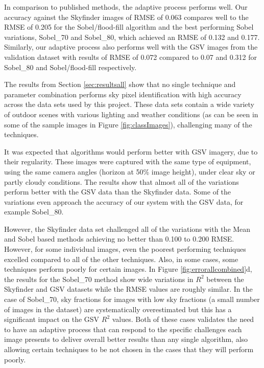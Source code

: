 \documentclass[final,3p,times,authoryear]{elsarticle}
\begin{document}
In comparison to published methods, the adaptive process performs well. Our accuracy against the Skyfinder images of RMSE of 0.063 compares well to the RMSE of 0.205 for the \cite{Middel2018} Sobel/flood-fill algorithm and the best performing \cite{Wang2015a} Sobel variations, Sobel\_70 and Sobel\_80, which achieved an RMSE of 0.132 and 0.177. Similarly, our adaptive process also performs well with the GSV images from the validation dataset with results of RMSE of 0.072 compared to 0.07 and 0.312 for Sobel\_80 and Sobel/flood-fill respectively.

The results from Section \ref{sec:resultsall} show that no single technique and parameter combination performs sky pixel identification with high accuracy across the data sets used by this project. These data sets contain a wide variety of outdoor scenes with various lighting and weather conditions (as can be seen in some of the sample images in Figure \ref{fig:classImages}), challenging many of the techniques. 

It was expected that algorithms would perform better with GSV imagery, due to their regularity. These images were captured with the same type of equipment, using the same camera angles (horizon at 50\% image height), under clear sky or partly cloudy conditions. The results show that almost all of the variations perform better with the GSV data than the Skyfinder data. Some of the variations even approach the accuracy of our system with the GSV data, for example Sobel\_80. 

However, the Skyfinder data set challenged all of the variations with the Mean and Sobel based methods achieving no better than 0.100 to 0.200 RMSE. However, for some individual images, even the poorest performing techniques excelled compared to all of the other techniques. Also, in some cases, some techniques perform poorly for certain images. In Figure \ref{fig:errorallcombined}d, the results for the Sobel\_70 method show wide variations in $R^{2}$ between the Skyfinder and GSV datasets while the RMSE values are roughly similar. In the case of Sobel\_70, sky fractions for images with low sky fractions (a small number of images in the dataset) are systematically overestimated but this has a significant impact on the GSV $R^{2}$ values. Both of these cases validates the need to have an adaptive process that can respond to the specific challenges each image presents to deliver overall better results than any single algorithm, also allowing certain techniques to be not chosen in the cases that they will perform poorly.
\end{document}
